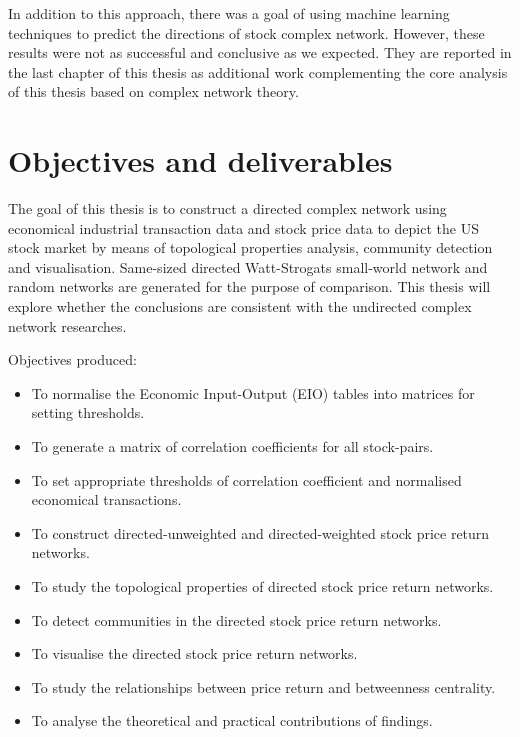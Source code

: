 In addition to this approach, there was a goal of using machine learning techniques to predict the directions of stock complex network. However, these results were not as successful and conclusive as we expected. They are reported in the last chapter of this thesis as additional work complementing the core analysis of this thesis based on complex network theory.


\section{Objectives and deliverables}
The goal of this thesis is to construct a directed complex network using economical industrial transaction data and stock price data to depict the US stock market by means of topological properties analysis, community detection and visualisation. Same-sized directed Watt-Strogats small-world network and random networks are generated for the purpose of comparison. This thesis will explore whether the conclusions are consistent with the undirected complex network researches.

\vline

Objectives produced:

\begin{itemize}
	\item To normalise the Economic Input-Output (EIO) tables into matrices for setting thresholds.
	\item To generate a matrix of correlation coefficients for all stock-pairs.
	\item To set appropriate thresholds of correlation coefficient and normalised economical transactions.
	\item To construct directed-unweighted and directed-weighted stock price return networks.
	\item To study the topological properties of directed stock price return networks.
	\item To detect communities in the directed stock price return networks.
	\item To visualise the directed stock price return networks.
	\item To study the relationships between price return and betweenness centrality.
	\item To analyse the theoretical and practical contributions of findings.
\end{itemize}

